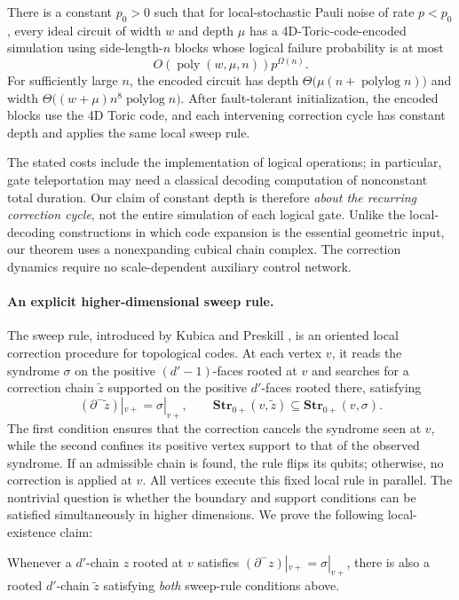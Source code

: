 \begin{theorem*}
There is a constant $p_0>0$ such that for local-stochastic Pauli noise of rate $p<p_0$, every ideal circuit of width $w$ and depth $\mu$ has a 4D-Toric-code-encoded simulation using side-length-$n$ blocks whose logical failure probability is at most
\begin{equation*}
  O\!\left(\operatorname{poly}(w,\mu,n)\right)p^{\Omega(n)}.
\end{equation*}
For sufficiently large $n$, the encoded circuit has depth $\Theta\!\bigl(\mu(n+\operatorname{polylog}n)\bigr)$ and width $\Theta\!\bigl((w+\mu)n^8\operatorname{polylog}n\bigr)$. After fault-tolerant initialization, the encoded blocks use the 4D Toric code, and each intervening correction cycle has constant depth and applies the same local sweep rule.
\end{theorem*}

The stated costs include the implementation of logical operations; in particular, gate teleportation may need a classical decoding computation of nonconstant total duration. Our claim of constant depth is therefore \emph{about the recurring correction cycle}, not the entire simulation of each logical gate. Unlike the local-decoding constructions in which code expansion is the essential geometric input, our theorem uses a nonexpanding cubical chain complex. The correction dynamics require no scale-dependent auxiliary control network.

\paragraph{An explicit higher-dimensional sweep rule.}
The sweep rule, introduced by Kubica and Preskill \cite{Kubica_2019}, is an oriented local correction procedure for topological codes. At each vertex $v$, it reads the syndrome $\sigma$ on the positive $(d'-1)$-faces rooted at $v$ and searches for a correction chain $\tilde z$ supported on the positive $d'$-faces rooted there, satisfying
\begin{equation*}
  (\partial^-\tilde z)|_{v+}=\sigma|_{v+},
  \qquad
  \mathbf{Str}_{0+}(v,\tilde z)\subseteq\mathbf{Str}_{0+}(v,\sigma).
\end{equation*}
The first condition ensures that the correction cancels the syndrome seen at $v$, while the second confines its positive vertex support to that of the observed syndrome. If an admissible chain is found, the rule flips its qubits; otherwise, no correction is applied at $v$. All vertices execute this fixed local rule in parallel.
The nontrivial question is whether the boundary and support conditions can be satisfied simultaneously in higher dimensions. We prove the following local-existence claim:
\begin{claim*}
  Whenever a $d'$-chain $z$ rooted at $v$ satisfies $(\partial^- z)|_{v+}=\sigma|_{v+}$, there is also a rooted $d'$-chain $\tilde z$ satisfying \emph{both} sweep-rule conditions above. 
\end{claim*}


